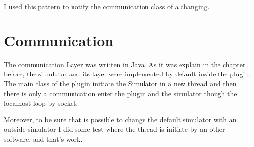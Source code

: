 I used this pattern to notify the communication class of a changing.

\section{Communication}



The communication Layer was written in Java. As it was explain in the chapter before, the simulator and its layer were implemented by default inside the plugin. The main class of the plugin initiate the Simulator in a new thread and then there is only a communication enter the plugin and the simulator though the localhost loop by socket.


Moreover, to be sure that is possible to change the default simulator with an outside simulator I did some test where the thread is initiate by an other software, and that's work. %






